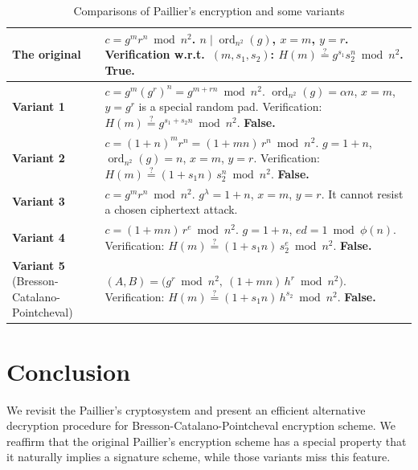 \documentclass[11pt,a4paper]{article}
\theoremstyle{remark}
\newcommand{\ord}{\operatorname{ord}}
\begin{document}
\begin{table}[h]
\centering
\caption{Comparisons of Paillier's encryption and some variants}
\renewcommand{\arraystretch}{1.3}
\begin{tabular}{@{}l p{}@{}}
\toprule
\textbf{The original} &
$c=g^m r^n \bmod n^2$. $n\mid\ord_{n^2}(g)$, $x=m$, $y=r$.\newline
Verification w.r.t.\ $(m,s_1,s_2)$: $H(m) \overset{?}{=} g^{s_1}s_2^n \bmod n^2$. \textbf{True.}\\
\midrule
\textbf{Variant 1} &
$c=g^m (g^r)^n = g^{m+rn} \bmod n^2$. $\ord_{n^2}(g)=\alpha n$, $x=m$, $y=g^r$ is a special random pad.\newline
Verification: $H(m) \overset{?}{=} g^{s_1+s_2 n} \bmod n^2$. \textbf{False.}\\
\midrule
\textbf{Variant 2} &
$c=(1+n)^m r^n = (1+mn)\,r^n \bmod n^2$. $g=1+n$, $\ord_{n^2}(g)=n$, $x=m$, $y=r$.\newline
Verification: $H(m) \overset{?}{=} (1+s_1 n)\,s_2^n \bmod n^2$. \textbf{False.}\\
\midrule
\textbf{Variant 3} &
$c=g^m r^n \bmod n^2$. $g^\lambda = 1+n$, $x=m$, $y=r$.\newline
It cannot resist a chosen ciphertext attack.\\
\midrule
\textbf{Variant 4} &
$c=(1+mn)\,r^e \bmod n^2$. $g=1+n$, $ed = 1 \bmod \phi(n)$.\newline
Verification: $H(m) \overset{?}{=} (1+s_1 n)\,s_2^e \bmod n^2$. \textbf{False.}\\
\midrule
\textbf{Variant 5} (Bresson-Catalano-Pointcheval) &
$(A,B) = \big(g^r \bmod n^2,\ (1+mn)\,h^r \bmod n^2\big)$.\newline
Verification: $H(m) \overset{?}{=} (1+s_1 n)\,h^{s_2} \bmod n^2$. \textbf{False.}\\
\bottomrule
\end{tabular}
\end{table}

\section{Conclusion}\label{sec:conclusion}

We revisit the Paillier's cryptosystem and present an efficient alternative decryption procedure for Bresson-Catalano-Pointcheval encryption scheme. We reaffirm that the original Paillier's encryption scheme has a special property that it naturally implies a signature scheme, while those variants miss this feature.
\end{document}
